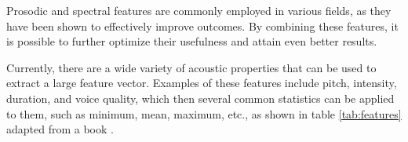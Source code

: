 Prosodic and spectral features are commonly employed in various fields, as they have been shown to effectively improve outcomes. By combining these features, it is possible to further optimize their usefulness and attain even better results.

Currently, there are a wide variety of acoustic properties that can be used to extract a large feature vector. Examples of these features include pitch, intensity, duration, and voice quality, which then several common statistics can be applied to them, such as minimum, mean, maximum, etc., as shown in table \ref{tab:features} adapted from a book \cite{Schuller2011}.


\begin{table}[h]
	\centering
	\caption{Overview on features commonly used for acoustic emotion recognition \cite{Schuller2011}.}
	\label{tab:features}
\end{table}
